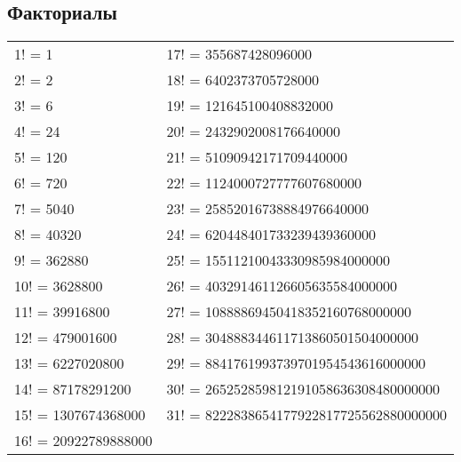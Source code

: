 \documentclass[12pt, a6paper]{extarticle}
\begin{document}
\subsection{Факториалы}


\begin{tabular}{ll}
1!  = 1 & 17! = 355687428096000 \\
2!  = 2 & 18! = 6402373705728000 \\
3!  = 6 & 19! = 121645100408832000 \\
4!  = 24 & 20! = 2432902008176640000 \\
5!  = 120 & 21! = 51090942171709440000 \\
6!  = 720 & 22! = 1124000727777607680000 \\
7!  = 5040 & 23! = 25852016738884976640000 \\
8!  = 40320  & 24! = 620448401733239439360000 \\
9!  = 362880 & 25! = 15511210043330985984000000 \\
10! = 3628800 & 26! = 403291461126605635584000000 \\
11! = 39916800 &  27! = 10888869450418352160768000000 \\
12! = 479001600 & 28! = 304888344611713860501504000000 \\
13! = 6227020800 & 29! = 8841761993739701954543616000000 \\
14! = 87178291200 & 30! = 265252859812191058636308480000000 \\
15! = 1307674368000 & 31! = 8222838654177922817725562880000000 \\
16! = 20922789888000 & 
\end{tabular}
\end{document}

